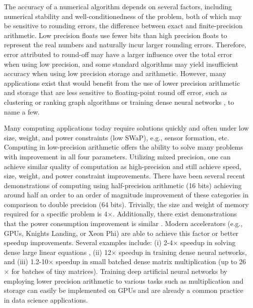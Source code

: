 The accuracy of a numerical algorithm depends on several factors, including numerical stability and well-conditionedness of the problem, both of which may be sensitive to rounding errors, the difference between exact and finite-precision arithmetic. 
Low precision floats use fewer bits than high precision floats to represent the real numbers and naturally incur larger rounding errors. 
Therefore, error attributed to round-off may have a larger influence over the total error when using low precision, and some standard algorithms may yield insufficient accuracy when using low precision storage and arithmetic.
However, many applications exist that would benefit from the use of lower precision arithmetic and storage that are less sensitive to floating-point round off error, such as clustering or ranking graph algorithms \cite{vonLuxburg2007} or training dense neural networks \cite{micikevicius2018mixed}, to name a few.\par

Many computing applications today require solutions quickly and often under low size, weight, and power constraints (low SWaP), e.g., sensor formation, etc. 
Computing in low-precision arithmetic offers the ability to solve many problems with improvement in all four parameters.
Utilizing mixed precision, one can achieve similar quality of computation as high-precision and still achieve 
speed, size, weight, and power constraint improvements. 
There have been several recent demonstrations of computing using half-precision arithmetic (16 bits) achieving around half an order to an 
order of magnitude improvement of these categories in comparison to double precision (64 bits).
Trivially, the size and weight of memory required for a specific problem is 4$\times$.
Additionally, there exist demonstrations that the power consumption improvement is similar
\cite{fagan2016powerwall}.
Modern accelerators (e.g., GPUs, Knights Landing, or Xeon Phi) are able to achieve this factor or better speedup improvements.
Several examples include:
(i)   2-4$\times$ speedup in solving dense large linear equations \cite{haidar2018iterative,haidar2019tensorcore},
(ii)  12$\times$ speedup in training dense neural networks,
and
(iii) 1.2-10$\times$ speedup in small batched dense matrix multiplication \cite{abdelfattah2019batched} (up to 26$\times$ for batches of tiny matrices).
Training deep artificial neural networks by employing lower precision arithmetic to various tasks such as multiplication \cite{Courbariaux2014Mult} and storage \cite{Courbariaux2014Storage} can easily be implemented on GPUs and are already a common practice in data science applications.\par

